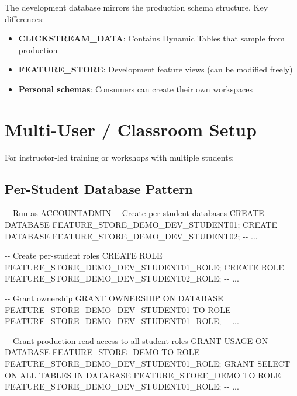 \documentclass[
  letterpaper,
  DIV=11,
  numbers=noendperiod]{scrreprt}
\newenvironment{Shaded}{\begin{snugshade}}{\end{snugshade}}
\newcommand{\CommentTok}[1]{\textcolor[rgb]{0.37,0.37,0.37}{#1}}
\newcommand{\KeywordTok}[1]{\textcolor[rgb]{0.00,0.23,0.31}{#1}}
\newcommand{\NormalTok}[1]{\textcolor[rgb]{0.00,0.23,0.31}{#1}}
\providecommand{\tightlist}{%
  \setlength{\itemsep}{0pt}\setlength{\parskip}{0pt}}\usepackage{longtable,booktabs,array}
\begin{document}
The development database mirrors the production schema structure. Key
differences:

\begin{itemize}
\tightlist
\item
  \textbf{CLICKSTREAM\_DATA}: Contains Dynamic Tables that sample from
  production
\item
  \textbf{FEATURE\_STORE}: Development feature views (can be modified
  freely)
\item
  \textbf{Personal schemas}: Consumers can create their own workspaces
\end{itemize}

\hypertarget{multi-user-classroom-setup}{%
\section{Multi-User / Classroom
Setup}\label{multi-user-classroom-setup}}

For instructor-led training or workshops with multiple students:

\hypertarget{per-student-database-pattern}{%
\subsection{Per-Student Database
Pattern}\label{per-student-database-pattern}}

\begin{Shaded}
\begin{Highlighting}[]
\CommentTok{{-}{-} Run as ACCOUNTADMIN}
\CommentTok{{-}{-} Create per{-}student databases}
\KeywordTok{CREATE} \KeywordTok{DATABASE}\NormalTok{ FEATURE\_STORE\_DEMO\_DEV\_STUDENT01;}
\KeywordTok{CREATE} \KeywordTok{DATABASE}\NormalTok{ FEATURE\_STORE\_DEMO\_DEV\_STUDENT02;}
\CommentTok{{-}{-} ...}

\CommentTok{{-}{-} Create per{-}student roles}
\KeywordTok{CREATE} \KeywordTok{ROLE}\NormalTok{ FEATURE\_STORE\_DEMO\_DEV\_STUDENT01\_ROLE;}
\KeywordTok{CREATE} \KeywordTok{ROLE}\NormalTok{ FEATURE\_STORE\_DEMO\_DEV\_STUDENT02\_ROLE;}
\CommentTok{{-}{-} ...}

\CommentTok{{-}{-} Grant ownership}
\KeywordTok{GRANT}\NormalTok{ OWNERSHIP }\KeywordTok{ON} \KeywordTok{DATABASE}\NormalTok{ FEATURE\_STORE\_DEMO\_DEV\_STUDENT01 }
    \KeywordTok{TO} \KeywordTok{ROLE}\NormalTok{ FEATURE\_STORE\_DEMO\_DEV\_STUDENT01\_ROLE;}
\CommentTok{{-}{-} ...}

\CommentTok{{-}{-} Grant production read access to all student roles}
\KeywordTok{GRANT} \KeywordTok{USAGE} \KeywordTok{ON} \KeywordTok{DATABASE}\NormalTok{ FEATURE\_STORE\_DEMO }\KeywordTok{TO} \KeywordTok{ROLE}\NormalTok{ FEATURE\_STORE\_DEMO\_DEV\_STUDENT01\_ROLE;}
\KeywordTok{GRANT} \KeywordTok{SELECT} \KeywordTok{ON} \KeywordTok{ALL} \KeywordTok{TABLES} \KeywordTok{IN} \KeywordTok{DATABASE}\NormalTok{ FEATURE\_STORE\_DEMO }
    \KeywordTok{TO} \KeywordTok{ROLE}\NormalTok{ FEATURE\_STORE\_DEMO\_DEV\_STUDENT01\_ROLE;}
\CommentTok{{-}{-} ...}
\end{Highlighting}
\end{Shaded}
\end{document}

